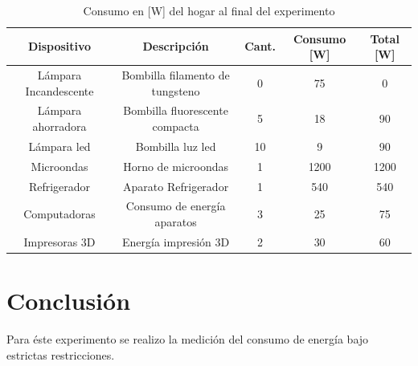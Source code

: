 \documentclass[]{article}
\begin{document}
\begin{table}[h!]
\centering

\begin{tabular}{|c|c|c|c|c|}
\hline
Dispositivo           & Descripción                     & Cant. & Consumo {[}W{]} & Total [W] \\ \hline
Lámpara Incandescente & Bombilla filamento de tungsteno & 0                  & 75              & 0           \\ \hline
Lámpara ahorradora    & Bombilla fluorescente compacta  & 5                 & 18              & 90           \\ \hline
Lámpara led           & Bombilla luz led                & 10                  & 9               & 90            \\ \hline
Microondas            & Horno de microondas             & 1                  & 1200            & 1200          \\ \hline
Refrigerador          & Aparato Refrigerador            & 1                  & 540             & 540           \\ \hline
Computadoras          & Consumo de energía aparatos     & 3                  & 25              & 75            \\ \hline
Impresoras 3D         & Energía impresión 3D            & 2                  & 30              & 60            \\ \hline
\end{tabular}
\caption{Consumo en [W] del hogar al final del experimento}
\label{tablaConsumoSegundo}
\end{table}


\section{Conclusión}

Para éste experimento se realizo la medición del consumo de energía bajo estrictas restricciones.



%
\end{document}
